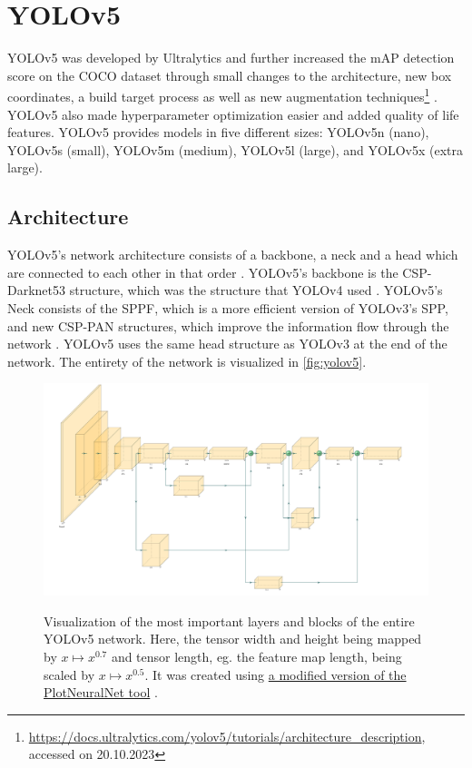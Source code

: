 \documentclass[10pt]{book}
\newcommand{\figureref}[1]{\autoref{#1}}
\begin{document}
\section{YOLOv5}

\ac{YOLO}v5 was developed by Ultralytics and further increased the mAP detection score on the \ac{COCO} dataset through small changes to the architecture, new box coordinates, a build target process as well as new augmentation techniques\footnote{\url{https://docs.ultralytics.com/yolov5/tutorials/architecture_description}, accessed on 20.10.2023} \cite{gjocher2022yolov5,terven2023comprehensive}. \ac{YOLO}v5 also made hyperparameter optimization easier and added quality of life features. \ac{YOLO}v5 provides models in five different sizes: \ac{YOLO}v5n (nano), \ac{YOLO}v5s (small), \ac{YOLO}v5m (medium), \ac{YOLO}v5l (large), and \ac{YOLO}v5x (extra large).

\subsection{Architecture}

\ac{YOLO}v5's network architecture consists of a backbone, a neck and a head which are connected to each other in that order \cite{jani2023model}. \ac{YOLO}v5's backbone is the CSP-Darknet53 structure, which was the structure that \ac{YOLO}v4 used \cite{bochkovskiy2020yolov4}. \ac{YOLO}v5's Neck consists of the \ac{SPPF}, which is a more efficient version of \ac{YOLO}v3's \ac{SPP}, and new \ac{CSP-PAN} structures, which improve the information flow through the network \cite{liu2018path}. \ac{YOLO}v5 uses the same head structure as \ac{YOLO}v3 at the end of the network. The entirety of the network is visualized in \figureref{fig:yolov5}.

\begin{figure}
  \caption{Visualization of the most important layers and blocks of the entire \ac{YOLO}v5 network. Here, the tensor width and height being mapped by $x \mapsto x^{0.7}$ and tensor length, eg. the feature map length, being scaled by $x \mapsto x^{0.5}$. It was created using \href{https://github.com/jnccd/PlotNeuralNet}{a modified version of the PlotNeuralNet tool} \cite{haris_iqbal_2018_2526396}.}
  \includegraphics[width=\textwidth]{image/yolov5}
  \label{fig:yolov5}
\end{figure}
\end{document}
